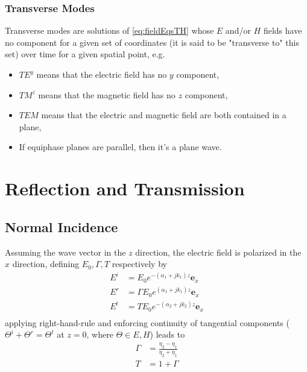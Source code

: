 \documentclass{article}
\begin{document}
\subsubsection{Transverse Modes}
Transverse modes are solutions of \eqref{eq:fieldEqsTH} whose $E$ and/or $H$ fields have no component for a given set of coordinates (it is said to be "transverse to" this set) over time for a given spatial point, e.g.
\begin{itemize}
\item $TE^y$ means that the electric field has no $y$ component,
\item $TM^z$ means that the magnetic field has no $z$ component,
\item $TEM$ means that the electric and magnetic field are both contained in a plane,
\item If equiphase planes are parallel, then it's a plane wave.
\end{itemize}
\newpage
\section{Reflection and Transmission}
\subsection{Normal Incidence}
Assuming the wave vector in the $z$ direction, the electric field is polarized in the $x$ direction, defining $E_0, \Gamma, T$ respectively by
\begin{subequations} 
    \begin{align*}
        E^i &= E_0 e^{-(\alpha_1 + jk_1) z} \mathbf{e}_x \\
        E^r &= \Gamma E_0 e^{(\alpha_1 + jk_1)z} \mathbf{e}_x \\
        E^t &= T E_0 e^{-(\alpha_2 + jk_2) z} \mathbf{e}_x \\
    \end{align*}
\end{subequations}
applying right-hand-rule and enforcing continuity of tangential components ($\Theta^i + \Theta^r = \Theta^t$ at $z=0$, where $\Theta \in {E,H}$) leads to 
\begin{subequations} \label{eq:losslessNormalReflection}
    \begin{align}
        \Gamma &= \frac{\eta_2 - \eta_1}{\eta_2 + \eta_1} \label{eq:reflectionNormal} \\
        T &= 1 + \Gamma
    \end{align}
\end{subequations}
\end{document}
